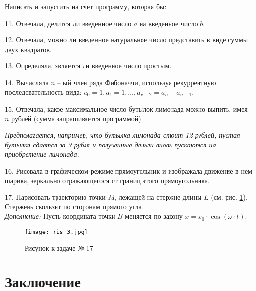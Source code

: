 Написать и запустить на счет программу, которая бы:

11. Отвечала, делится ли введенное число $a$ на введенное число $b$.

12. Отвечала, можно ли введенное натуральное число предста­вить в виде суммы двух квадратов.

13. Определяла, является ли введенное число простым.

14. Вычисляла $n$ -- ый член ряда Фибоначчи, используя рекур­рентную последовательность вида: 
$a_0 = 1, a_1 = 1, \ldots ,a_{n+2} = a_n + a_{n+1}.$

    15. Отвечала, какое максимальное число бутылок лимонада можно выпить, имея $n$ рублей (сумма запрашивается программой).
    
{\it Предполагается, например, что бутылка лимонада стоит 12 рублей, пустая бутылка сдается за 3 рубля и полученные деньги вновь пускаются на приобретение лимонада.}

16.	Рисовала в графическом режиме прямоугольник и изображала движение в нем шарика, зеркально отражающегося от границ этого прямоугольника.

17. Нарисовать траекторию точки $M$, лежащей на стержне длины $L$ (см. рис. \ref{ris4}). Стержень скользит по сторонам прямого угла. \\
{\it Дополнение:} Пусть координата точки $B$  меняется по закону 
$x = x_0\cdot\cos(\omega\cdot t).$
   
\begin{figure}[!hb]
\centerline{
\texttt{[image: ris\_3.jpg]}}
\caption{Рисунок к задаче № 17}
\label{ris4}
\end{figure}
 

\section{Заключение}


